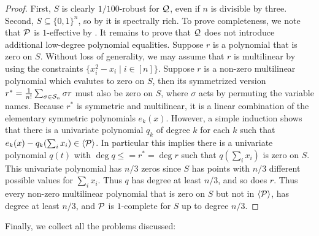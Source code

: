 \begin{proof}
First, $S$ is clearly $1/100$-robust for $\mathcal Q$, even if $n$ is divisible by three. Second, $S \subseteq \{0,1\}^n$, so by  it is spectrally rich. To prove completeness, we note that $\mathcal P$ is $1$-effective by . It remains to prove that $\mathcal Q$ does not introduce additional low-degree polynomial equalities. 
Suppose $r$ is a polynomial that is zero on $S$.  
Without loss of generality, we may assume that $r$ is multilinear by using the constraints $\{x_i^2 - x_i \mid i \in [n]\}$.
Suppose $r$ is a non-zero multilinear polynomial which evalutes to zero on $S$, then its symmetrized version $r^* = \frac{1}{n!}\sum_{\sigma \in \mathcal S_n} \sigma r$ must also be zero on $S$, where $\sigma$ acts by permuting the variable names. Because $r^*$ is symmetric and multilinear, it is a linear combination of the elementary symmetric polynomials $e_k(x)$. However, a simple induction shows that there is a univariate polynomial $q_k$ of degree $k$ for each $k$ such that $e_k(x) - q_k(\sum_i x_i) \in \langle \mathcal P \rangle$. In particular this implies there is a univariate polynomial $q(t)$ with $\deg q \leq = r^* = \deg r$ such that $q(\sum_i x_i)$ is zero on $S$.
This univariate polynomial has $n/3$ zeros since $S$ has points with $n/3$ different possible values for $\sum_i x_i$. Thus $q$ has degree at least $n/3$, and so does $r$. Thus every non-zero multilinear polynomial that is zero on $S$ but not in $\langle \mathcal P\rangle$, has degree at least $n/3$, and $\mathcal P$ is $1$-complete for $S$ up to degree $n/3$.
\end{proof}
Finally, we collect all the problems discussed:
